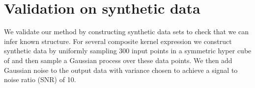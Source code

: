 \documentclass[twoside]{article}
\begin{document}












\section{Validation on synthetic data}

We validate our method by constructing synthetic data sets to check that we can infer known structure.
For several composite kernel expression we construct synthetic data by uniformly sampling 300 input points in a symmetric hyper cube of and then sample a Gaussian process over these data points.
We then add \iid Gaussian noise to the output data with variance chosen to achieve a signal to noise ratio (SNR\footnotemark) of 10.
\end{document}
